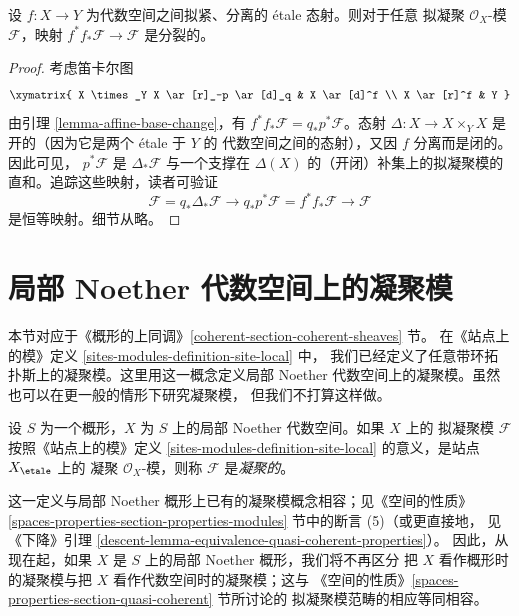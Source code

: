 \begin{lemma}
\label{lemma-etale-pull-push-split}
设 $f : X \to Y$ 为代数空间之间拟紧、分离的 \'etale 态射。则对于任意
拟凝聚 $\mathcal{O}_X$-模 $\mathcal{F}$，映射
$f^*f_*\mathcal{F} \to \mathcal{F}$ 是分裂的。
\end{lemma}

\begin{proof}
考虑笛卡尔图
$$
\xymatrix{
X \times_Y X \ar[r]_-p \ar[d]_q & X \ar[d]^f \\
X \ar[r]^f & Y
}
$$
由引理 \ref{lemma-affine-base-change}，有
$f^*f_*\mathcal{F} = q_*p^*\mathcal{F}$。态射
$\Delta : X \to X \times_Y X$ 是开的（因为它是两个 \'etale 于 $Y$ 的
代数空间之间的态射），又因 $f$ 分离而是闭的。因此可见，
$p^*\mathcal{F}$ 是 $\Delta_*\mathcal{F}$ 与一个支撑在
$\Delta(X)$ 的（开闭）补集上的拟凝聚模的直和。追踪这些映射，读者可验证
$$
\mathcal{F} = q_*\Delta_*\mathcal{F} \to
q_*p^*\mathcal{F} = f^*f_*\mathcal{F} \to
\mathcal{F}
$$
是恒等映射。细节从略。
\end{proof}



\section{局部 Noether 代数空间上的凝聚模}
\label{section-coherent}

\noindent
本节对应于《概形的上同调》\ref{coherent-section-coherent-sheaves} 节。
在《站点上的模》定义 \ref{sites-modules-definition-site-local} 中，
我们已经定义了任意带环拓扑斯上的凝聚模。这里用这一概念定义局部
Noether 代数空间上的凝聚模。虽然也可以在更一般的情形下研究凝聚模，
但我们不打算这样做。

\begin{definition}
\label{definition-coherent}
设 $S$ 为一个概形，$X$ 为 $S$ 上的局部 Noether 代数空间。如果 $X$ 上的
拟凝聚模 $\mathcal{F}$ 按照《站点上的模》定义
\ref{sites-modules-definition-site-local} 的意义，是站点 $X_\etale$ 上的
凝聚 $\mathcal{O}_X$-模，则称 $\mathcal{F}$ 是{\it 凝聚的}。
\end{definition}

\noindent
这一定义与局部 Noether 概形上已有的凝聚模概念相容；见《空间的性质》
\ref{spaces-properties-section-properties-modules} 节中的断言 (5)（或更直接地，
见《下降》引理 \ref{descent-lemma-equivalence-quasi-coherent-properties}）。
因此，从现在起，如果 $X$ 是 $S$ 上的局部 Noether 概形，我们将不再区分
把 $X$ 看作概形时的凝聚模与把 $X$ 看作代数空间时的凝聚模；这与
《空间的性质》\ref{spaces-properties-section-quasi-coherent} 节所讨论的
拟凝聚模范畴的相应等同相容。

